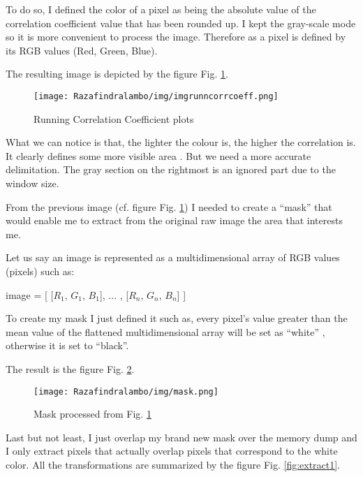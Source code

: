 To do so, I defined the color of a pixel as being the absolute value of the correlation coefficient
value that has been rounded up. I kept the gray-scale mode so it is more convenient to process the
image. Therefore as a pixel is defined by its RGB values (Red, Green, Blue).


The resulting image is depicted by the figure Fig. \ref{fig:imgrunncorrcoeff}.

\begin{figure}[!h]
\begin{center}
    \texttt{[image: Razafindralambo/img/imgrunncorrcoeff.png]}
    \caption{Running Correlation Coefficient plots}
    \label{fig:imgrunncorrcoeff}
\end{center}
\end{figure}

What we can notice is that, the lighter the colour is, the higher the correlation is. It clearly
defines some more visible area . But we need a more accurate delimitation. The gray section on the
rightmost is an ignored part due to the window size.

From the previous image (cf. figure Fig. \ref{fig:imgrunncorrcoeff}) I needed to create a ``mask''
that would enable me to extract from the original raw image the area that
interests me.

Let us say an image is represented as a multidimensional array of RGB values (pixels) such as:
 
image = [ [$R_1$, $G_1$, $B_1$],
          ...  ,
          [$R_n$, $G_n$, $B_n$] ]
 

To create my mask I just defined it such as, every pixel's value greater than the mean value of the
flattened multidimensional array will be set as ``white'' , otherwise it is set to
``black''. 

The result is the figure Fig. \ref{fig:mask1}.
\begin{figure}[!h]
\begin{center}
    \texttt{[image: Razafindralambo/img/mask.png]}
    \caption{Mask processed from Fig. \ref{fig:imgrunncorrcoeff}}
    \label{fig:mask1}
\end{center}
\end{figure}

Last but not least, I just overlap my brand new mask over the memory dump and I only extract
pixels that actually overlap pixels that correspond to the white color. All the
transformations are summarized by the figure Fig. \ref{fig:extract1}.

